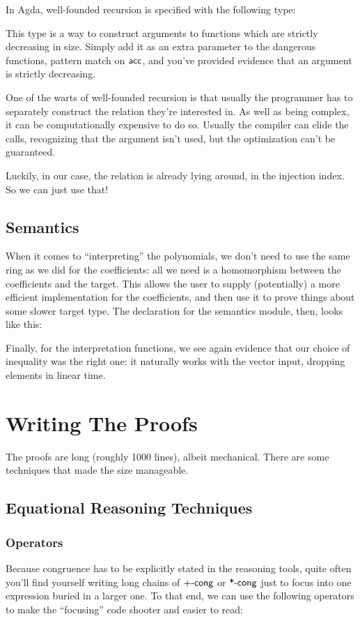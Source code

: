\documentclass[draft, twocolumn]{article}
\theoremstyle{definition}
\theoremstyle{remark}
\begin{document}
In Agda,  well-founded recursion is specified with the following type:

This type is a way to construct arguments to functions which are strictly
decreasing in size. Simply add it as an extra parameter to the dangerous
functions, pattern match on \(\AgdaInductiveConstructor{acc}\), and you've
provided evidence that an argument is strictly decreasing.

One of the warts of well-founded recursion is that usually the programmer has to
separately construct the relation they're interested in. As well as being
complex, it can be computationally expensive to do so. Usually the compiler can
elide the calls, recognizing that the argument isn't used, but the optimization
can't be guaranteed.

Luckily, in our case, the relation is already lying around, in the injection
index. So we can just use that!

\subsection{Semantics}
When it comes to ``interpreting'' the polynomials, we don't need to use the same
ring as we did for the coefficients: all we need is a homomorphism between the
coefficients and the target. This allows the user to supply (potentially) a more
efficient implementation for the coefficients, and then use it to prove things
about some slower target type. The declaration for the semantics module, then,
looks like this:

Finally, for the interpretation functions, we see again evidence that our
choice of inequality was the right one: it naturally works with the vector
input, dropping elements in linear time.

\section{Writing The Proofs}
The proofs are long (roughly 1000 lines), albeit mechanical. There are some
techniques that made the size manageable.
\subsection{Equational Reasoning Techniques}
\subsubsection{Operators}
Because congruence has to be explicitly stated in the reasoning tools, quite
often you'll find yourself writing long chains of \(\AgdaFunction{+-cong}\) or
\(\AgdaFunction{*-cong}\) just to focus into one expression buried in a larger
one. To that end, we can use the following operators to make the ``focusing''
code shooter and easier to read:
\end{document}
